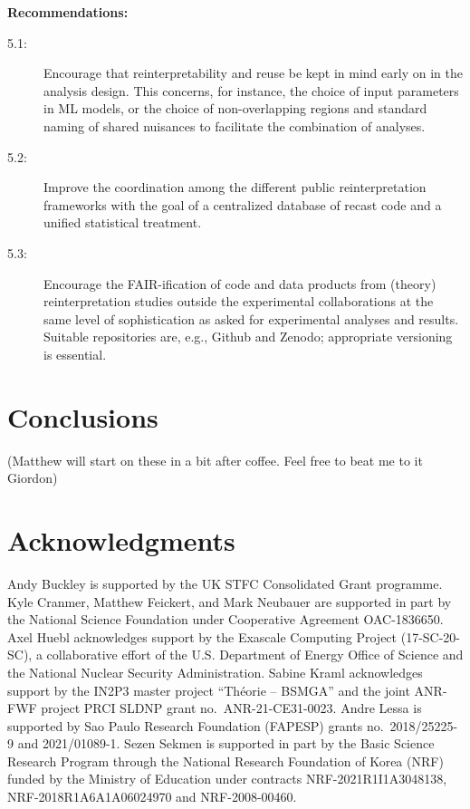 \documentclass[11pt]{article}
\begin{document}
\noindent
\textbf{Recommendations:}
\begin{description}
   \item[5.1:] Encourage that reinterpretability and reuse be kept in mind early on in the analysis design. This concerns, for instance, the choice of input parameters in \gls{ML} models, or the choice of non-overlapping regions and standard naming of shared nuisances to facilitate the combination of analyses.
   \item[5.2:] Improve the coordination among the different public reinterpretation frameworks  with the goal of a centralized database of recast code and a unified statistical treatment.
   \item[5.3:] Encourage the \gls{FAIR}-ification of code and \glspl{data product} from (theory) reinterpretation studies outside the experimental collaborations at the same level of sophistication as asked for experimental analyses and results. Suitable repositories are, e.g., Github and Zenodo; appropriate versioning is essential.
\end{description}


\section{Conclusions}

(Matthew will start on these in a bit after coffee. Feel free to beat me to it Giordon)

\section*{Acknowledgments}

Andy Buckley is supported by the UK STFC Consolidated Grant programme.
Kyle Cranmer, Matthew Feickert, and Mark Neubauer are supported in part by the National Science Foundation under Cooperative Agreement OAC-1836650.
Axel Huebl acknowledges support by the Exascale Computing Project (17-SC-20-SC), a collaborative effort of the U.S. Department of Energy Office of Science and the National Nuclear Security Administration.
Sabine Kraml acknowledges support by the IN2P3 master project ``Th\'eorie -- BSMGA'' and the joint ANR-FWF project PRCI SLDNP grant no.~ANR-21-CE31-0023.
Andre Lessa is supported by Sao Paulo Research Foundation (FAPESP) grants no.~2018/25225-9 and 2021/01089-1.
Sezen Sekmen is supported in part by the Basic Science Research Program through the National Research Foundation of Korea (NRF) funded by the Ministry of Education under contracts NRF-2021R1I1A3048138, NRF-2018R1A6A1A06024970 and NRF-2008-00460.
\end{document}
